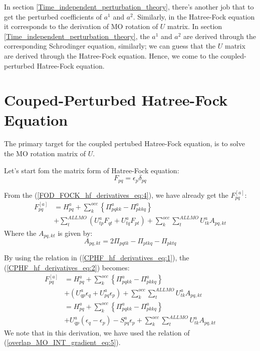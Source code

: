 In section \ref{Time_independent_perturbation_theory}, there's another job that
to get the perturbed coefficients of $a^{1}$ and $a^{2}$. Similarly, in the
Hatree-Fock equation it corresponds to the derivation of MO rotation of $U$
matrix. In section \ref{Time_independent_perturbation_theory}, the $a^{1}$ and
$a^{2}$ are derived through the corresponding Schrodinger equation, similarly;
we can guess that the $U$ matrix are derived through the Hatree-Fock equation.
Hence, we come to the coupled-perturbed Hatree-Fock equation.

\section{Couped-Perturbed Hatree-Fock Equation}\label{CPHF}
%
%
%
The primary target for the coupled pertubed Hatree-Fock equation, is
to solve the MO rotation matrix of $U$.

Let's start fom the matrix form of Hatree-Fock equation:
\begin{equation}
  \label{CPHF_hf_derivatives_eq:1}
  F_{pq} = \epsilon_{p}\delta_{pq}
\end{equation}

From the (\ref{FOD_FOCK_hf_derivatives_eq:4}), we have already get the
$F_{pq}^{[a]}$:
\begin{align}
  \label{CPHF_hf_derivatives_eq:2}
  F_{pq}^{[a]} &= H^{a}_{pq} + \sum_{k}^{occ}\left \{\Pi^{a}_{pqkk} -
    \Pi^{a}_{pkkq} \right\}
  \nonumber \\
  &+ \sum_{t}^{ALL MO}\left(U^{a}_{tp}F_{qt} + U^{a}_{tq}F_{pt}\right)
  + \sum_{k}^{occ}\sum_{t}^{ALL MO}U^{a}_{tk}A_{pq,kt}
\end{align}
Where the $A_{pq,kt}$ is given by:
\begin{equation}
  \label{CPHF_hf_derivatives_eq:3}
  A_{pq,kt}  = 2\Pi_{pqtk} - \Pi_{ptkq} - \Pi_{pktq}
\end{equation}

By using the relation in (\ref{CPHF_hf_derivatives_eq:1}), the
(\ref{CPHF_hf_derivatives_eq:2}) becomes:
\begin{align}
  \label{CPHF_hf_derivatives_eq:4}
  F_{pq}^{[a]} &= H^{a}_{pq} + \sum_{k}^{occ}\left \{\Pi^{a}_{pqkk} -
    \Pi^{a}_{pkkq} \right\}
  \nonumber \\
  &+ \left(U^{a}_{qp}\epsilon_{q} + U^{a}_{pq}\epsilon_{p}\right)
  + \sum_{k}^{occ}\sum_{t}^{ALL MO}U^{a}_{tk}A_{pq,kt} \nonumber \\
  &= H^{a}_{pq} + \sum_{k}^{occ}\left \{\Pi^{a}_{pqkk} -
    \Pi^{a}_{pkkq} \right\}
  \nonumber \\
  &+ U^{a}_{qp}\left(\epsilon_{q} - \epsilon_{p}\right) -
  S^{a}_{pq}\epsilon_{p} + \sum_{k}^{occ}\sum_{t}^{ALL
    MO}U^{a}_{tk}A_{pq,kt}
\end{align}
We note that in this derivation, we have used the relation of
(\ref{overlap_MO_INT_gradient_eq:5}).

